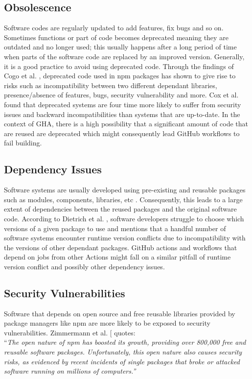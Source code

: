 \documentclass[conference]{IEEEtran}
\begin{document}
\subsection{Obsolescence}

Software codes are regularly updated to add features, fix bugs and so on. Sometimes functions or part of code becomes deprecated meaning they are outdated and no longer used; this usually happens after a long period of time when parts of the software code are replaced by an improved version. Generally, it is a good practice to avoid using deprecated code. Through the findings of Cogo et al. \cite{b6}, deprecated code used in npm packages has shown to give rise to risks such as incompatibility between two different dependant libraries, presence/absence of features, bugs, security vulnerability and more. Cox et al. \cite{b17} found that deprecated systems are four time more likely to suffer from security issues and backward incompatibilities than systems that are up-to-date. In the context of GHA, there is a high possibility that a significant amount of code that are reused are deprecated which might consequently lead GitHub workflows to fail building.
\subsection{Dependency Issues}
Software systems are usually developed using pre-existing and reusable packages such as modules, components, libraries, etc \cite{b7}\cite{b8}. Consequently, this leads to a large extent of dependencies between the reused packages and the original software code. According to Dietrich et al. \cite{b10}, software developers struggle to choose which versions of a given package to use and mentions that a handful number of software systems encounter runtime version conflicts due to incompatibility with the versions of other dependant packages. GitHub actions and workflows that depend on jobs from other Actions might fall on a similar pitfall of runtime version conflict and possibly other dependency issues.
\subsection{Security Vulnerabilities}
Software that depends on open source and free reusable libraries provided by package managers like npm are more likely to be exposed to security vulnerabilities. Zimmermann et al. [\cite{b12} quotes: \\

“\textit{The open nature of npm has boosted its growth, providing over 800,000 free and reusable software packages. Unfortunately, this open nature also causes security risks, as evidenced by recent incidents of single packages that broke or attacked software running on millions of computers.”} \\
\end{document}
